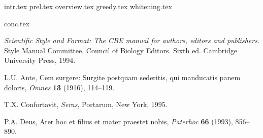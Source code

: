 \documentclass{IOS-Book-Article}
\begin{document}
 {intr.tex}
 {prel.tex}
 {overview.tex}
 {greedy.tex}
 {whitening.tex}


 {conc.tex}



\newpage



\begin{thebibliography}{99}

\textit{Scientific Style and Format: The CBE manual for authors,
editors and publishers}. Style Manual Committee, Council of Biology Editors.
Sixth ed. Cambridge University Press, 1994.

L.U. Ante, Cem surgere: Surgite postquam sederitis, qui manducatis panem doloris,
\textit{Omnes} \textbf{13} (1916), 114--119.

T.X. Confortavit, \textit{Seras}, Portarum, New York, 1995.

P.A. Deus, Ater hoc et filius et mater praestet nobis,
\textit{Paterhoc} \textbf{66} (1993), 856--890.

\end{thebibliography}
\end{document}
